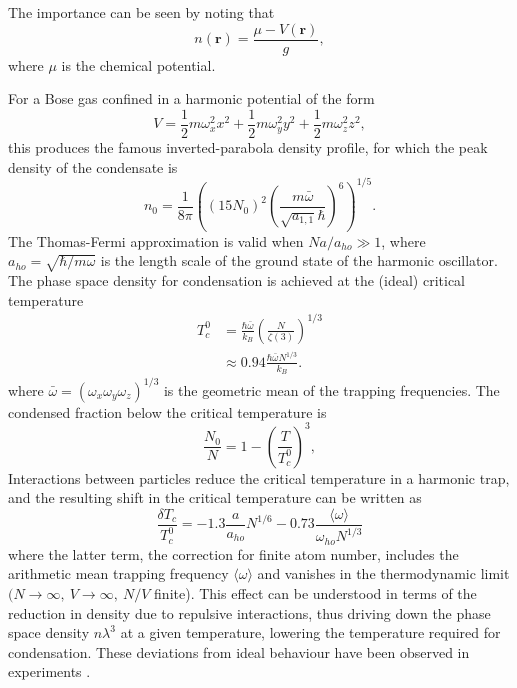 	The importance can be seen by noting that 
	\begin{equation}
		n(\textbf{r}) = \frac{\mu-V(\textbf{r})}{g},
	\end{equation}
	where $\mu$ is the chemical potential.
	
	For a Bose gas confined in a harmonic potential of the form
	\begin{equation}
		V = \frac{1}{2} m \omega_x^2 x^2 + \frac{1}{2} m \omega_y^2 y^2 + \frac{1}{2} m \omega_z^2 z^2,
	\end{equation}
	this produces the famous inverted-parabola density profile,	for which the peak density of the condensate is
	\begin{equation}
		n_0 = \frac{1}{8 \pi}\left( (15N_0)^2 \left(\frac{m \bar{\omega}}{\sqrt{a_{1,1}} \hbar}\right)	 ^{6}\right)^{1/5}.
		\label{eqn:n0}
	\end{equation}
	The Thomas-Fermi approximation is valid when $N a/a_{ho}\gg1$, where $a_{ho} = \sqrt{\hbar/m\omega}$ is the length scale of the ground state of the harmonic oscillator.
	The phase space density for condensation is achieved at the (ideal) critical temperature 
	\begin{align}
		T_c^{0} &= \frac{\hbar \bar{\omega}}{k_B}\left(\frac{N}{\zeta(3)}\right)^{1/3}\\
				&\approx0.94\frac{\hbar \bar{\omega} N^{1/3}}{k_B}.
	\end{align}
	where $\bar{\omega}=(\omega_x\omega_y\omega_z)^{1/3}$ is the geometric mean of the trapping frequencies.
	The condensed fraction below the critical temperature is 
	\begin{equation}
		\frac{N_0}{N} = 1 - \left(\frac{T}{T_c^{0}}\right)^3,
	\end{equation}
	Interactions between particles reduce the critical temperature in a harmonic trap, and the resulting shift in the critical temperature can be written as 
	\begin{equation}
		\frac{\delta T_c}{T_c^{0}} = -1.3 \frac{a}{a_{ho}} N^{1/6} -0.73\frac{ \langle\omega\rangle}{\omega_{ho} N^{1/3}}
	\end{equation}
	where the latter term, the correction for finite atom number, includes the arithmetic mean trapping frequency $\langle\omega\rangle$ and vanishes in the thermodynamic limit $(N\rightarrow\infty,~V\rightarrow\infty,~N/V$ finite).
	This effect can be understood in terms of the reduction in density due to repulsive interactions, thus driving down the phase space density $n\lambda^3$ at a given temperature, lowering the temperature required for condensation.
	These deviations from ideal behaviour have been observed in experiments \cite{tammuz11,smith11}.

